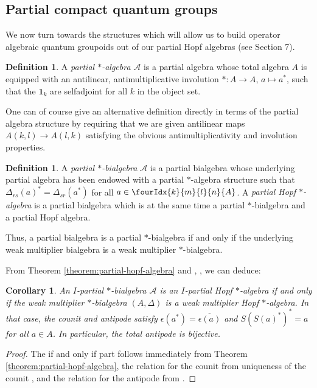 \documentclass[10pt]{article}
\newcommand{\Gr}[5]{\fourIdx{#2}{#4}{#3}{#5}{#1}}%
\newtheorem{Cor}[Theorem]{Corollary}
\theoremstyle{definition}
\newtheorem{Def}[Theorem]{Definition}
\numberwithin{equation}{section}
\begin{document}
\subsection{Partial compact quantum groups}

We now turn towards the structures which will allow us to build operator algebraic quantum groupoids out of our partial Hopf algebras (see Section 7).
 
\begin{Def} A \emph{partial $*$-algebra} $\mathscr{A}$ is a partial
  algebra whose total algebra $A$ is equipped with an antilinear,
  antimultiplicative involution $*\colon A\rightarrow A$, $ a\mapsto
  a^*$,  such that the $\mathbf{1}_k$ are selfadjoint for all $k$ in
  the object set. 
\end{Def} 

One can of course give an alternative definition directly in terms of the partial algebra structure by requiring that we are given antilinear maps $A(k,l)\rightarrow A(l,k)$ satisfying the obvious antimultiplicativity and involution properties.

\begin{Def} A \emph{partial $*$-bialgebra} $\mathscr{A}$ is a
 partial bialgebra whose underlying partial algebra has been
  endowed with a partial $*$-algebra structure such that
$\Delta_{rs}(a)^* = \Delta_{sr}(a^*)$ for all $a \in \Gr{A}{k}{l}{m}{n}$.
A \emph{partial Hopf $*$-algebra} is a partial bialgebra which is at the same time a partial $*$-bialgebra and a partial Hopf algebra.
\end{Def} 
Thus, a partial bialgebra is a partial
$*$-bialgebra if and only if the underlying weak multiplier bialgebra
 is a weak multiplier $*$-bialgebra.

From Theorem \ref{theorem:partial-hopf-algebra} and \cite{Boh1},
\cite{VDW1}, we can deduce:
\begin{Cor} \label{cor:involutive}
  An $I$-partial $*$-bialgebra $\mathscr{A}$ is an $I$-partial Hopf
  $*$-algebra if and only if the weak multiplier $*$-bialgebra
  $(A,\Delta)$ is a weak multiplier Hopf $*$-algebra. In that case,
  the counit and antipode satisfy
  $\epsilon(a^{*})=\overline{\epsilon(a)}$ and $S(S(a)^{*})^{*}=a$ for
  all $a\in A$. In particular, the total antipode is bijective.
\end{Cor}
\begin{proof}
  The if and only if part follows immediately from  Theorem
  \ref{theorem:partial-hopf-algebra}, the relation for the counit  from
uniqueness of the counit  \cite[Theorem 2.8]{Boh1}, and the relation
for the antipode from \cite[Proposition 4.11]{VDW1}.
\end{proof}
\end{document}
